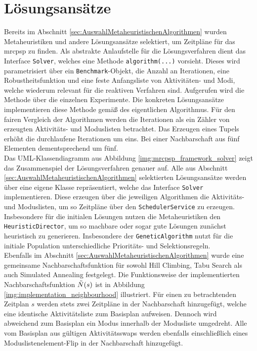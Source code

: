 \section{Lösungsansätze} \label{sec:Loesungsansaetze}

Bereits im Abschnitt \ref{sec:AuswahlMetaheuristischenAlgorithmen}  wurden Metaheuristiken und andere Lösungsansätze selektiert, um Zeitpläne für das \ac{mrcpsp} zu finden. Als abstrakte Anlaufstelle für die Lösungsverfahren dient das Interface \lstinline|Solver|, welches eine Methode \lstinline|algorithm(...)| vorsieht. Dieses wird parametrisiert über ein \lstinline|Benchmark|-Objekt, die Anzahl an Iterationen, eine Robustheitsfunktion und eine feste Anfangsliste von Aktivitäten- und Modi, welche wiederum relevant für die reaktiven Verfahren sind. Aufgerufen wird die Methode über die einzelnen Experimente. Die konkreten Lösungsansätze implementieren diese Methode gemäß des eigentlichen Algorithmus. Für den fairen Vergleich der Algorithmen werden die Iterationen als ein Zähler von erzeugten Aktivitäts- und Moduslisten betrachtet. Das Erzeugen eines Tupels erhöht die durchlaufene Iterationen um eins. Bei einer Nachbarschaft aus fünf Elementen dementsprechend um fünf. \\

Das UML-Klassendiagramm aus Abbildung \ref{img:mrcpsp_framework_solver} zeigt das Zusammenspiel der Lösungsverfahren genauer auf. Alle aus Abschnitt \ref{sec:AuswahlMetaheuristischenAlgorithmen} selektierten Lösungsansätze werden über eine eigene Klasse repräsentiert, welche das Interface \lstinline|Solver| implementieren. Diese erzeugen über die jeweiligen Algorithmen die Aktivitäts- und Moduslisten, um so Zeitpläne über den \lstinline|SchedulerService| zu erzeugen. Insbesondere für die initialen Lösungen nutzen die Metaheuristiken den \lstinline|HeuristicDirector|, um so machbare oder sogar gute Lösungen zunächst heuristisch zu generieren. Insbesondere der \lstinline|GeneticAlgorithm| nutzt für die initiale Population unterschiedliche Prioritäts- und Selektionsregeln. \\

Ebenfalls im Abschnitt \ref{sec:AuswahlMetaheuristischenAlgorithmen} wurde eine gemeinsame Nachbarschaftsfunktion für sowohl Hill Climbing, Tabu Search als auch Simulated Annealing festgelegt. Die Funktionsweise der implementierten Nachbarschaftsfunktion $\Tilde{N}(s)$ ist in Abbildung \ref{img:implementation_neighbourhood} illustriert. Für einen zu betrachtenden Zeitplan $s$ werden stets zwei Zeitpläne in der Nachbarschaft hinzugefügt, welche eine identische Aktivitätsliste zum Basisplan aufweisen. Dennoch wird abweichend zum Basisplan ein Modus innerhalb der Modusliste umgedreht. Alle vom Basisplan aus gültigen Aktivitätsswaps werden ebenfalls einschließlich eines Moduslistenelement-Flip in der Nachbarschaft hinzugefügt. \\

